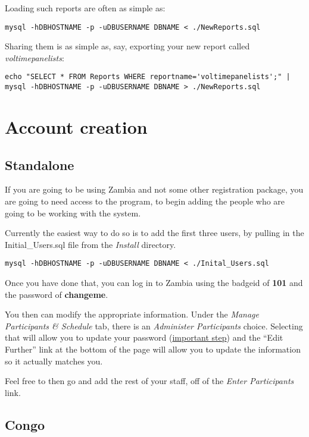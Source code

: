 \documentclass[tablesignature]{scrartcl}
\begin{document}
  Loading such reports are often as simple as:
\begin{verbatim}
mysql -hDBHOSTNAME -p -uDBUSERNAME DBNAME < ./NewReports.sql
\end{verbatim}



  Sharing them is as simple as, say, exporting your new report called
  \emph{voltimepanelists}:
\begin{verbatim}
echo "SELECT * FROM Reports WHERE reportname='voltimepanelists';" | 
mysql -hDBHOSTNAME -p -uDBUSERNAME DBNAME > ./NewReports.sql
\end{verbatim}
\section{Account creation}
\label{sec-7}
\subsection{Standalone}
\label{sec-7_1}

   If you are going to be using Zambia and not some other registration
   package, you are going to need access to the program, to begin
   adding the people who are going to be working with the system.

   Currently the easiest way to do so is to add the first three users,
   by pulling in the Initial\_{}Users.sql file from the \emph{Install}
   directory.

\begin{verbatim}
mysql -hDBHOSTNAME -p -uDBUSERNAME DBNAME < ./Inital_Users.sql
\end{verbatim}



   Once you have done that, you can log in to Zambia using the badgeid
   of \textbf{101} and the password of \textbf{changeme}.

   You then can modify the appropriate information.  Under the \emph{Manage    Participants \& Schedule} tab, there is an \emph{Administer Participants}
   choice.  Selecting that will allow you to update your password
   (\underline{important step}) and the ``Edit Further'' link at the bottom of
   the page will allow you to update the information so it actually
   matches you.

   Feel free to then go and add the rest of your staff, off of the
   \emph{Enter Participants} link.
\subsection{Congo}
\label{sec-7_2}
\end{document}
